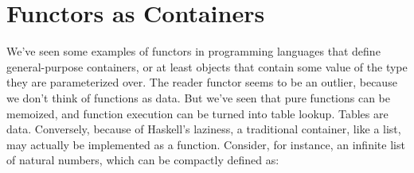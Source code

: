 \section{Functors as Containers}\label{functors-as-containers}

We've seen some examples of functors in programming languages that
define general-purpose containers, or at least objects that contain some
value of the type they are parameterized over. The reader functor seems
to be an outlier, because we don't think of functions as data. But we've
seen that pure functions can be memoized, and function execution can be
turned into table lookup. Tables are data. Conversely, because of
Haskell's laziness, a traditional container, like a list, may actually
be implemented as a function. Consider, for instance, an infinite list
of natural numbers, which can be compactly defined as:

